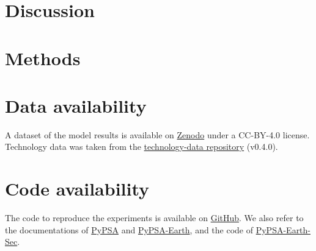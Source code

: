 \documentclass[5p,numafflabel]{elsarticle}
\begin{document}


\section*{Discussion}
\label{sec:discussion}



\label{sec:conclusion}



\section*{Methods}
\label{sec:methods}













\section*{Data availability}
A dataset of the model results is available on \href{https://doi.org/10.5281/zenodo.10951650}{Zenodo} under a CC-BY-4.0 license. 
Technology data was taken from the
\href{https://github.com/pypsa/technology-data}{technology-data repository} (v0.4.0).

\section*{Code availability}
The code to reproduce the experiments is available on \href{https://github.com/energyLS/aldehyde}{GitHub}.
We also refer to the documentations of \href{https://pypsa.readthedocs.io}{PyPSA} and  \href{https://pypsa-earth.readthedocs.io}{PyPSA-Earth}, and the code of 
\href{https://github.com/pypsa-meets-earth/pypsa-earth-sec}{PyPSA-Earth-Sec}.
\end{document}
